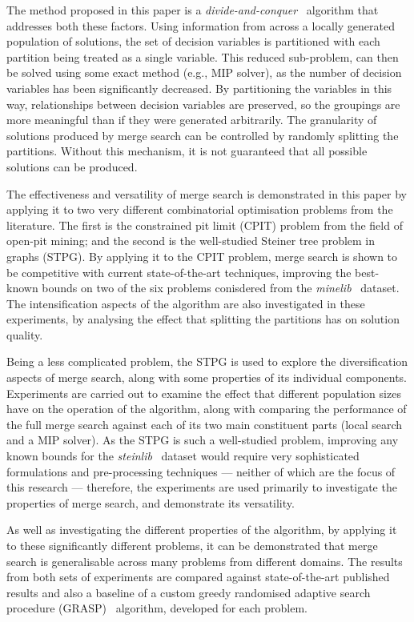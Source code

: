 \documentclass[journal]{IEEEtran}
\begin{document}
The method proposed in this paper is a \emph{divide-and-conquer}~\cite{alg:levitin} algorithm that addresses both these factors. Using information from across a locally generated population of solutions, the set of decision variables is partitioned with each partition being treated as a single variable. This reduced sub-problem, can then be solved using some exact method (e.g., MIP solver), as the number of decision variables has been significantly decreased. By partitioning the variables in this way, relationships between decision variables are preserved, so the groupings are more meaningful than if they were generated arbitrarily. The granularity of solutions produced by merge search can be controlled by randomly splitting the partitions. Without this mechanism, it is not guaranteed that all possible solutions can be produced.

The effectiveness and versatility of merge search is demonstrated in this paper by applying it to two very different combinatorial optimisation problems from the literature. The first is the constrained pit limit (CPIT) problem from the field of open-pit mining; and the second is the well-studied Steiner tree problem in graphs (STPG). By applying it to the CPIT problem, merge search is shown to be competitive with current state-of-the-art techniques, improving the best-known bounds on two of the six problems conisdered from the \emph{minelib}~\cite{minelib} dataset. The intensification aspects of the algorithm are also investigated in these experiments, by analysing the effect that splitting the partitions has on solution quality.

Being a less complicated problem, the STPG is used to explore the diversification aspects of merge search, along with some properties of its individual components. Experiments are carried out to examine the effect that different population sizes have on the operation of the algorithm, along with comparing the performance of the full merge search against each of its two main constituent parts (local search and a MIP solver). As the STPG is such a well-studied problem, improving any known bounds for the \emph{steinlib}~\cite{steinlib} dataset would require very sophisticated formulations and pre-processing techniques --- neither of which are the focus of this research --- therefore, the experiments are used primarily to investigate the properties of merge search, and demonstrate its versatility.

As well as investigating the different properties of the algorithm, by applying it to these significantly different problems, it can be demonstrated that merge search is generalisable across many problems from different domains. The results from both sets of experiments are compared against state-of-the-art published results and also a baseline of a custom greedy randomised adaptive search procedure (GRASP)~\cite{grasp:feo} algorithm, developed for each problem.
\end{document}
